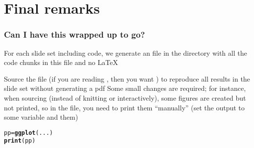 \documentclass[aspectratio=169]{beamer}\usepackage[]{graphicx}\usepackage[]{xcolor}
\makeatletter
\newcommand{\hldef}[1]{\textcolor[rgb]{0.345,0.345,0.345}{#1}}%
\newcommand{\hlkwb}[1]{\textcolor[rgb]{0.69,0.353,0.396}{#1}}%
\newcommand{\hlkwd}[1]{\textcolor[rgb]{0.737,0.353,0.396}{\textbf{#1}}}%
\newenvironment{kframe}{%
 \def\at@end@of@kframe{}%
 \ifinner\ifhmode%
  \def\at@end@of@kframe{\end{minipage}}%
  \begin{minipage}{\columnwidth}%
 \fi\fi%
 \def\FrameCommand##1{\hskip\@totalleftmargin \hskip-\fboxsep
 \colorbox{shadecolor}{##1}\hskip-\fboxsep
     \hskip-\linewidth \hskip-\@totalleftmargin \hskip\columnwidth}%
 \MakeFramed {\advance\hsize-\width
   \@totalleftmargin\z@ \linewidth\hsize
   \@setminipage}}%
 {\par\unskip\endMakeFramed%
 \at@end@of@kframe}
\newenvironment{knitrout}{}{} %
\makeatother
\begin{document}
\section*{Final remarks}
\begin{frame}\frametitle{Can I have this wrapped up to go?}
For each slide set including  code, we generate an  file in the  directory with all the code chunks in this  file and no \LaTeX
\vfill

Source the file (if you are reading , then you want ) to reproduce all results in the slide set without generating a pdf
\vfill
Some small changes are required; for instance, when sourcing (instead of knitting or interactively), some figures are created but not printed, so in the  file, you need to print them ``manually'' (set the output to some variable and  them)
\vfill
\begin{knitrout}
\color{fgcolor}\begin{kframe}
\begin{alltt}
\hldef{pp} \hlkwb{=} \hlkwd{ggplot}\hldef{(...)}
\hlkwd{print}\hldef{(pp)}
\end{alltt}
\end{kframe}
\end{knitrout}
\end{frame}




% 
% 
\end{document}
